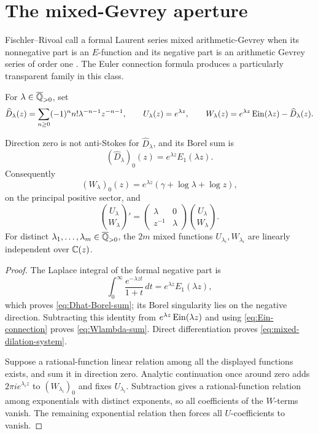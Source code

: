 \section{The mixed-Gevrey aperture}
\label{sec:mixed-gevrey}

Fischler--Rivoal call a formal Laurent series mixed arithmetic-Gevrey when
its nonnegative part is an \(E\)-function and its negative part is an
arithmetic Gevrey series of order one
\cite{FischlerRivoalMixed2024}.  The Euler connection formula produces a
particularly transparent family in this class.

For \(\lambda\in\overline{\mathbb Q}_{>0}\), set
\begin{equation}\label{eq:mixed-dilation-family}
 \widehat D_\lambda(z)=
 \sum_{n\ge0}(-1)^n n!\lambda^{-n-1}z^{-n-1},\qquad
 U_\lambda(z)=e^{\lambda z},\qquad
 W_\lambda(z)=e^{\lambda z}\operatorname{Ein}(\lambda z)-\widehat D_\lambda(z).
\end{equation}

\begin{proposition}
\label{prop:mixed-dilation-rank}
Direction zero is not anti-Stokes for \(\widehat D_\lambda\), and its
Borel sum is
\begin{equation}\label{eq:Dhat-Borel-sum}
 (\widehat D_\lambda)_0(z)=e^{\lambda z}E_1(\lambda z).
\end{equation}
Consequently
\begin{equation}\label{eq:Wlambda-sum}
 (W_\lambda)_0(z)=e^{\lambda z}
 (\gamma+\log\lambda+\log z),
\end{equation}
on the principal positive sector, and
\begin{equation}\label{eq:mixed-dilation-system}
 \binom{U_\lambda}{W_\lambda}'
 =\begin{pmatrix}\lambda&0\\z^{-1}&\lambda\end{pmatrix}
 \binom{U_\lambda}{W_\lambda}.
\end{equation}
For distinct \(\lambda_1,\ldots,\lambda_m\in\overline{\mathbb Q}_{>0}\), the \(2m\)
mixed functions \(U_{\lambda_i},W_{\lambda_i}\) are linearly independent
over \(\mathbb C(z)\).
\end{proposition}

\begin{proof}
The Laplace integral of the formal negative part is
\[
 \int_0^\infty\frac{e^{-\lambda zt}}{1+t}\,dt
 =e^{\lambda z}E_1(\lambda z),
\]
which proves \eqref{eq:Dhat-Borel-sum}; its Borel singularity lies on the
negative direction.  Subtracting this identity from
\(e^{\lambda z}\operatorname{Ein}(\lambda z)\) and using
\eqref{eq:Ein-connection} proves \eqref{eq:Wlambda-sum}.  Direct
differentiation proves \eqref{eq:mixed-dilation-system}.

Suppose a rational-function linear relation among all the displayed
functions exists, and sum it in direction zero.  Analytic continuation once
around zero adds \(2\pi i e^{\lambda_i z}\) to
\((W_{\lambda_i})_0\) and fixes \(U_{\lambda_i}\).  Subtraction gives a
rational-function relation among exponentials with distinct exponents, so
all coefficients of the \(W\)-terms vanish.  The remaining exponential
relation then forces all \(U\)-coefficients to vanish.
\end{proof}

